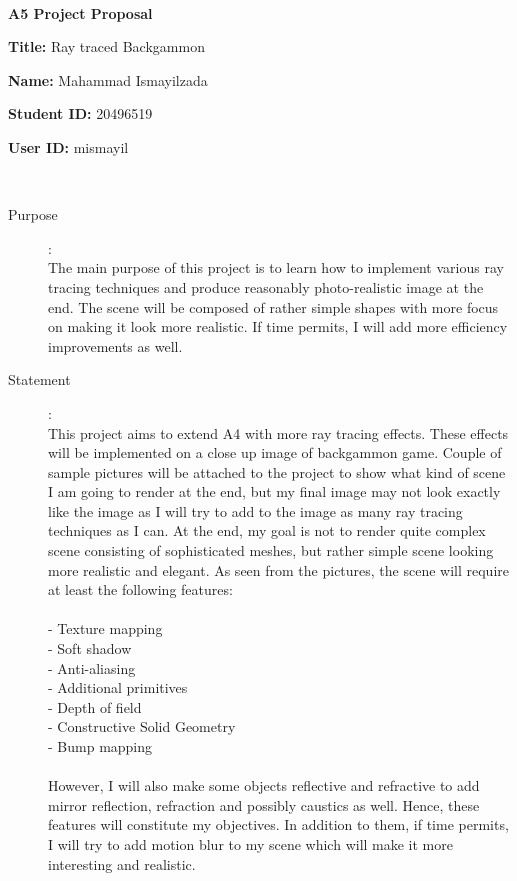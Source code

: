 \documentclass {article}
\begin{document}
~\vfill
\begin{center}
\Large

{\bf A5 Project Proposal}

{\bf Title:} Ray traced Backgammon

{\bf Name:} Mahammad Ismayilzada

{\bf Student ID:} 20496519

{\bf User ID:} mismayil
\end{center}
\vfill ~\vfill~
\newpage
{}
\begin{description}
\item[Purpose]:\\
	The main purpose of this project is to learn how to implement various ray tracing techniques
	and produce reasonably photo-realistic image at the end. The scene will be composed of rather
	simple shapes with more focus on making it look more realistic. If time permits, I will add
	more efficiency improvements as well.

\item[Statement]:\\
	This project aims to extend A4 with more ray tracing effects. These effects will be
	implemented on a close up image of backgammon game. Couple of sample pictures will
	be attached to the project to show what kind of scene I am going to render at the end,
	but my final image may not look exactly like the image as I will try to add to the image
	as many ray tracing techniques as I can. At the end, my goal is not to render quite
	complex scene consisting of sophisticated meshes, but rather simple scene looking more
	realistic and elegant. As seen from the pictures, the scene will require at least the
	following features:\\
		\\ - Texture mapping
		\\ - Soft shadow
		\\ - Anti-aliasing
		\\ - Additional primitives
		\\ - Depth of field
		\\ - Constructive Solid Geometry
		\\ - Bump mapping\\
		\\
	However, I will also make some objects reflective and refractive to add mirror reflection,
	refraction and possibly caustics as well. Hence, these features will constitute my objectives.
	In addition to them, if time permits, I will try to add motion blur to my scene which will make it
	more interesting and realistic.


\end{description}
\end{document}
